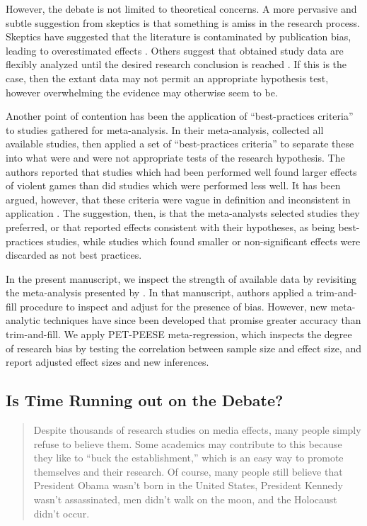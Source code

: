 \documentclass[man]{apa6}
\begin{document}
However, the debate is not limited to theoretical concerns. A more pervasive and subtle suggestion from skeptics is that something is amiss in the research process.  
Skeptics have suggested that the literature is contaminated by publication bias, leading to overestimated effects \citep{Ferguson:2007a}. 
Others suggest that obtained study data are flexibly analyzed until the desired research conclusion is reached \citep{Elson:etal:2014;Ferguson:CITATION:NEEDED}. If this is the case, then the extant data may not permit an appropriate hypothesis test, however overwhelming the evidence may otherwise seem to be. 

Another point of contention has been the application of ``best-practices criteria'' to studies gathered for meta-analysis. In their meta-analysis, \citet{Anderson:etal:2010} collected all available studies, then applied a set of ``best-practices criteria'' to separate these into what were and were not appropriate tests of the research hypothesis. The authors reported that studies which had been performed well found larger effects of violent games than did studies which were performed less well. It has been argued, however, that these criteria were vague in definition and inconsistent in application \citep{Elson?Ferguson?}. The suggestion, then, is that the meta-analysts selected studies they preferred, or that reported effects consistent with their hypotheses, as being best-practices studies, while studies which found smaller or non-significant effects were discarded as not best practices.

In the present manuscript, we inspect the strength of available data by revisiting the meta-analysis presented by \citet{Anderson:etal:2010}. In that manuscript, authors applied a trim-and-fill procedure \citep{Duval:Tweedie:20XX} to inspect and adjust for the presence of bias. However, new meta-analytic techniques have since been developed that promise greater accuracy than trim-and-fill. We apply PET-PEESE meta-regression, which inspects the degree of research bias by testing the correlation between sample size and effect size, and report adjusted effect sizes and new inferences.

\subsection{Is Time Running out on the Debate?}
\begin{quote}
Despite thousands of research studies on media effects, many people simply refuse to believe them. Some academics may contribute to this because they like to ``buck the establishment,'' which is an easy way to promote themselves and their research. Of course, many people still believe that President Obama wasn't born in the United States, President Kennedy wasn't assassinated, men didn't walk on the moon, and the Holocaust didn't occur. \citep[p. 572]{Strasburger:etal:2014}
\end{quote}
\end{document}
